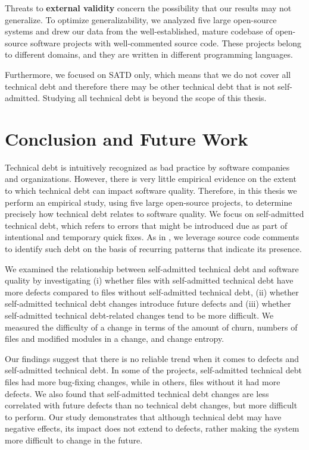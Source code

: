 Threats  to {\bf external validity} concern the possibility that our results may not generalize. To optimize generalizability, we analyzed five large open-source systems and drew our data from the well-established, mature codebase of open-source software projects with well-commented source code. These projects belong to different domains, and they are written in different programming languages.


Furthermore, we focused on SATD only, which means that we do not cover all technical debt and therefore there may be other technical debt that is not self-admitted. Studying all technical debt is beyond the scope of this thesis.





\section{Conclusion and Future Work}
\label{chap3:sec:conclusion}



Technical debt is intuitively recognized as bad practice by software companies and organizations. However, there is very little empirical evidence on the extent to which technical debt can impact software quality. Therefore, in this thesis we perform an empirical study, using five large open-source projects, to determine precisely how technical debt relates to software quality. We focus on self-admitted technical debt, which refers to  errors that might be introduced due as part of intentional and temporary quick fixes. As in  \cite{ICSM_PotdarS14}, we leverage source code comments to identify such debt on the basis of recurring patterns that indicate its presence.


We examined the relationship between self-admitted technical debt and software quality by investigating (i) whether files with self-admitted technical debt have more defects compared to files without self-admitted technical debt, (ii) whether self-admitted technical debt changes introduce future defects and (iii) whether self-admitted technical debt-related changes tend to be more difficult. We measured the difficulty of a change in terms of the amount of churn, numbers of files and modified modules in a change, and change entropy.




Our findings suggest that there is no reliable trend when it comes to defects and self-admitted technical debt. In some of the projects, self-admitted technical debt files had more bug-fixing changes, while in others, files without it had more defects. We also found that self-admitted technical debt changes are less correlated with future defects than no technical debt changes, but more difficult to perform. 
  Our study demonstrates that although technical debt may have negative effects, its impact does not extend to defects, rather making the system more difficult to change in the future.

